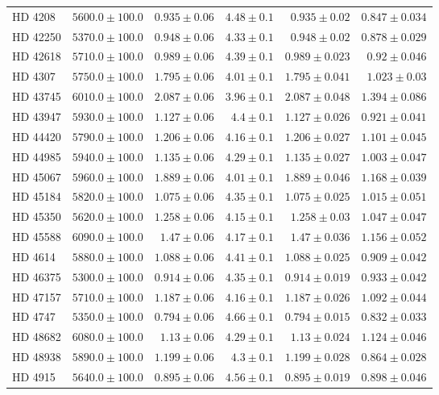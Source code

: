 \begin{longtable*}{lrrrrr}
HD 4208 & $5600.0\pm 100.0$ & $0.935\pm 0.06$ & $4.48\pm 0.1$ & $0.935\pm 0.02$ & $0.847\pm 0.034$ \\ 
HD 42250 & $5370.0\pm 100.0$ & $0.948\pm 0.06$ & $4.33\pm 0.1$ & $0.948\pm 0.02$ & $0.878\pm 0.029$ \\ 
HD 42618 & $5710.0\pm 100.0$ & $0.989\pm 0.06$ & $4.39\pm 0.1$ & $0.989\pm 0.023$ & $0.92\pm 0.046$ \\ 
HD 4307 & $5750.0\pm 100.0$ & $1.795\pm 0.06$ & $4.01\pm 0.1$ & $1.795\pm 0.041$ & $1.023\pm 0.03$ \\ 
HD 43745 & $6010.0\pm 100.0$ & $2.087\pm 0.06$ & $3.96\pm 0.1$ & $2.087\pm 0.048$ & $1.394\pm 0.086$ \\ 
HD 43947 & $5930.0\pm 100.0$ & $1.127\pm 0.06$ & $4.4\pm 0.1$ & $1.127\pm 0.026$ & $0.921\pm 0.041$ \\ 
HD 44420 & $5790.0\pm 100.0$ & $1.206\pm 0.06$ & $4.16\pm 0.1$ & $1.206\pm 0.027$ & $1.101\pm 0.045$ \\ 
HD 44985 & $5940.0\pm 100.0$ & $1.135\pm 0.06$ & $4.29\pm 0.1$ & $1.135\pm 0.027$ & $1.003\pm 0.047$ \\ 
HD 45067 & $5960.0\pm 100.0$ & $1.889\pm 0.06$ & $4.01\pm 0.1$ & $1.889\pm 0.046$ & $1.168\pm 0.039$ \\ 
HD 45184 & $5820.0\pm 100.0$ & $1.075\pm 0.06$ & $4.35\pm 0.1$ & $1.075\pm 0.025$ & $1.015\pm 0.051$ \\ 
HD 45350 & $5620.0\pm 100.0$ & $1.258\pm 0.06$ & $4.15\pm 0.1$ & $1.258\pm 0.03$ & $1.047\pm 0.047$ \\ 
HD 45588 & $6090.0\pm 100.0$ & $1.47\pm 0.06$ & $4.17\pm 0.1$ & $1.47\pm 0.036$ & $1.156\pm 0.052$ \\ 
HD 4614 & $5880.0\pm 100.0$ & $1.088\pm 0.06$ & $4.41\pm 0.1$ & $1.088\pm 0.025$ & $0.909\pm 0.042$ \\ 
HD 46375 & $5300.0\pm 100.0$ & $0.914\pm 0.06$ & $4.35\pm 0.1$ & $0.914\pm 0.019$ & $0.933\pm 0.042$ \\ 
HD 47157 & $5710.0\pm 100.0$ & $1.187\pm 0.06$ & $4.16\pm 0.1$ & $1.187\pm 0.026$ & $1.092\pm 0.044$ \\ 
HD 4747 & $5350.0\pm 100.0$ & $0.794\pm 0.06$ & $4.66\pm 0.1$ & $0.794\pm 0.015$ & $0.832\pm 0.033$ \\ 
HD 48682 & $6080.0\pm 100.0$ & $1.13\pm 0.06$ & $4.29\pm 0.1$ & $1.13\pm 0.024$ & $1.124\pm 0.046$ \\ 
HD 48938 & $5890.0\pm 100.0$ & $1.199\pm 0.06$ & $4.3\pm 0.1$ & $1.199\pm 0.028$ & $0.864\pm 0.028$ \\ 
HD 4915 & $5640.0\pm 100.0$ & $0.895\pm 0.06$ & $4.56\pm 0.1$ & $0.895\pm 0.019$ & $0.898\pm 0.046$ \\ 

\end{longtable*}
